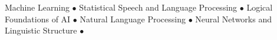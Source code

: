 Machine Learning $\bullet$ Statistical Speech and Language Processing $\bullet$ Logical Foundations of AI $\bullet$ Natural Language Processing $\bullet$ Neural Networks and Linguistic Structure $\bullet$

